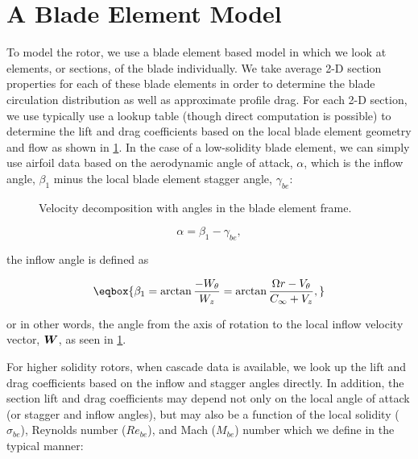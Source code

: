 


\section{A Blade Element Model}
\label{ssec:bladeelementmodel}

To model the rotor, we use a blade element based model in which we look at elements, or sections, of the blade individually.
%
We take average 2-D section properties for each of these blade elements in order to determine the blade circulation distribution as well as approximate profile drag.
%
For each 2-D section, we use typically use a lookup table (though direct computation is possible) to determine the lift and drag coefficients based on the local blade element geometry and flow as shown in \cref{fig:bladeelementangles}.
%
In the case of a low-solidity blade element, we can simply use airfoil data based on the aerodynamic angle of attack, \(\alpha\), which is the inflow angle, \(\beta_1\) minus the local blade element stagger angle, \(\gamma_{be}\):

\begin{figure}[h!]
    \centering
    \caption{Velocity decomposition with angles in the blade element frame.}
    \label{fig:bladeelementangles}
\end{figure}

\begin{equation}
    \label{eqn:localangleofattack}
    \alpha = \beta_1 - \gamma_{be},
\end{equation}

\where the inflow angle is defined as

\begin{equation}
    \label{eqn:inflowangle}
    \eqbox{
    \beta_1 = \arctan \frac{-W_\theta}{W_z} = \arctan \frac{\Omega r - V_\theta}{C_\infty + V_z},
}
\end{equation}

\noindent or in other words, the angle from the axis of rotation to the local inflow velocity vector, \(\bm{W}\), as seen in \cref{fig:bladeelementangles}.

For higher solidity rotors, when cascade data is available, we look up the lift and drag coefficients based on the inflow and stagger angles directly.
%
In addition, the section lift and drag coefficients may depend not only on the local angle of attack (or stagger and inflow angles), but may also be a function of the local solidity (\(\sigma_{be}\)), Reynolds number (\(Re_{be}\)), and Mach (\(M_{be}\)) number which we define in the typical manner:


